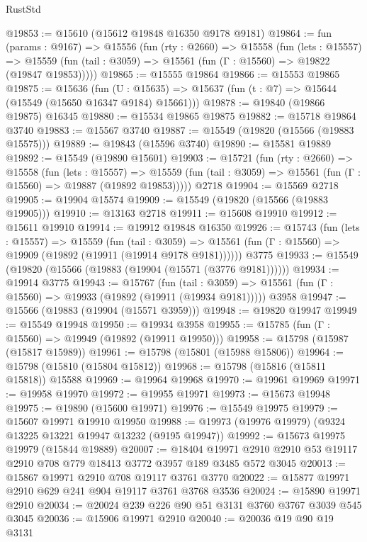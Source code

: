 \begin{lexlean}{RustStd}
\begin{coremodule}
@19853 := @15610 (@15612 @19848 @16350 @9178 @9181)
@19864 := fun (params : @9167) =>
  @15556
    (fun (rty : @2660) =>
    @15558
      (fun (lets : @15557) =>
      @15559 (fun (tail : @3059) => @15561 (fun (Γ : @15560) => @19822 (@19847 @19853)))))
@19865 := @15555 @19864
@19866 := @15553 @19865
@19875 := @15636
    (fun (U : @15635) => @15637 (fun (t : @7) => @15644 (@15549 (@15650 @16347 @9184) @15661)))
@19878 := @19840 (@19866 @19875) @16345
@19880 := @15534 @19865 @19875
@19882 := @15718 @19864 @3740
@19883 := @15567 @3740
@19887 := @15549 (@19820 (@15566 (@19883 @15575)))
@19889 := @19843 (@15596 @3740)
@19890 := @15581 @19889
@19892 := @15549 (@19890 @15601)
@19903 := @15721
    (fun (rty : @2660) =>
    @15558
      (fun (lets : @15557) =>
      @15559 (fun (tail : @3059) => @15561 (fun (Γ : @15560) => @19887 (@19892 @19853)))))
    @2718
@19904 := @15569 @2718
@19905 := @19904 @15574
@19909 := @15549 (@19820 (@15566 (@19883 @19905)))
@19910 := @13163 @2718
@19911 := @15608 @19910
@19912 := @15611 @19910
@19914 := @19912 @19848 @16350
@19926 := @15743
    (fun (lets : @15557) =>
    @15559
      (fun (tail : @3059) =>
      @15561 (fun (Γ : @15560) => @19909 (@19892 (@19911 (@19914 @9178 @9181))))))
    @3775
@19933 := @15549 (@19820 (@15566 (@19883 (@19904 (@15571 (@3776 @9181))))))
@19934 := @19914 @3775
@19943 := @15767
    (fun (tail : @3059) => @15561 (fun (Γ : @15560) => @19933 (@19892 (@19911 (@19934 @9181)))))
    @3958
@19947 := @15566 (@19883 (@19904 (@15571 @3959)))
@19948 := @19820 @19947
@19949 := @15549 @19948
@19950 := @19934 @3958
@19955 := @15785 (fun (Γ : @15560) => @19949 (@19892 (@19911 @19950)))
@19958 := @15798 (@15987 (@15817 @15989))
@19961 := @15798 (@15801 (@15988 @15806))
@19964 := @15798 (@15810 (@15804 @15812))
@19968 := @15798 (@15816 (@15811 @15818)) @15588
@19969 := @19964 @19968
@19970 := @19961 @19969
@19971 := @19958 @19970
@19972 := @19955 @19971
@19973 := @15673 @19948
@19975 := @19890 (@15600 @19971)
@19976 := @15549 @19975
@19979 := @15607 @19971 @19910 @19950
@19988 := @19973 (@19976 @19979) (@9324 @13225 @13221 @19947 @13232 (@9195 @19947))
@19992 := @15673 @19975 @19979 (@15844 @19889)
@20007 := @18404
    @19971
    @2910
    @2910
    @53
    @19117
    @2910
    @708
    @779
    @18413
    @3772
    @3957
    @189
    @3485
    @572
    @3045
@20013 := @15867 @19971 @2910 @708 @19117 @3761 @3770
@20022 := @15877 @19971 @2910 @629 @241 @904 @19117 @3761 @3768 @3536
@20024 := @15890 @19971 @2910
@20034 := @20024 @239 @226 @90 @51 @3131 @3760 @3767 @3039 @545 @3045
@20036 := @15906 @19971 @2910
@20040 := @20036 @19 @90 @19 @3131

\end{coremodule}
\end{lexlean}
